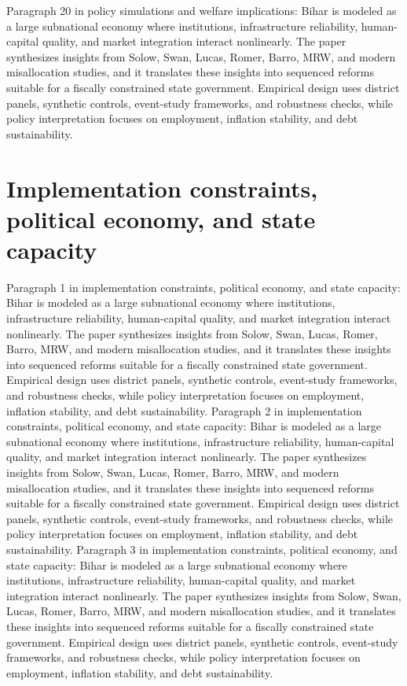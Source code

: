 \documentclass[preprint,12pt]{elsarticle}
\begin{document}
Paragraph 20 in policy simulations and welfare implications: Bihar is modeled as a large subnational economy where institutions, infrastructure reliability, human-capital quality, and market integration interact nonlinearly. The paper synthesizes insights from Solow, Swan, Lucas, Romer, Barro, MRW, and modern misallocation studies, and it translates these insights into sequenced reforms suitable for a fiscally constrained state government. Empirical design uses district panels, synthetic controls, event-study frameworks, and robustness checks, while policy interpretation focuses on employment, inflation stability, and debt sustainability.
\section{Implementation constraints, political economy, and state capacity}
Paragraph 1 in implementation constraints, political economy, and state capacity: Bihar is modeled as a large subnational economy where institutions, infrastructure reliability, human-capital quality, and market integration interact nonlinearly. The paper synthesizes insights from Solow, Swan, Lucas, Romer, Barro, MRW, and modern misallocation studies, and it translates these insights into sequenced reforms suitable for a fiscally constrained state government. Empirical design uses district panels, synthetic controls, event-study frameworks, and robustness checks, while policy interpretation focuses on employment, inflation stability, and debt sustainability.
Paragraph 2 in implementation constraints, political economy, and state capacity: Bihar is modeled as a large subnational economy where institutions, infrastructure reliability, human-capital quality, and market integration interact nonlinearly. The paper synthesizes insights from Solow, Swan, Lucas, Romer, Barro, MRW, and modern misallocation studies, and it translates these insights into sequenced reforms suitable for a fiscally constrained state government. Empirical design uses district panels, synthetic controls, event-study frameworks, and robustness checks, while policy interpretation focuses on employment, inflation stability, and debt sustainability.
Paragraph 3 in implementation constraints, political economy, and state capacity: Bihar is modeled as a large subnational economy where institutions, infrastructure reliability, human-capital quality, and market integration interact nonlinearly. The paper synthesizes insights from Solow, Swan, Lucas, Romer, Barro, MRW, and modern misallocation studies, and it translates these insights into sequenced reforms suitable for a fiscally constrained state government. Empirical design uses district panels, synthetic controls, event-study frameworks, and robustness checks, while policy interpretation focuses on employment, inflation stability, and debt sustainability.
\end{document}
